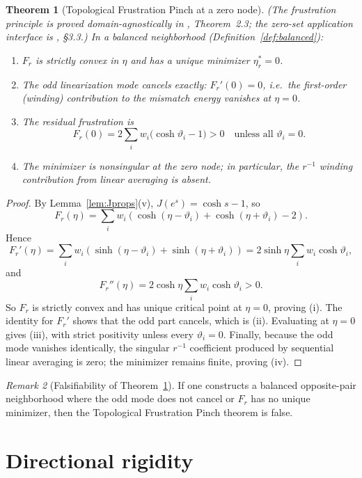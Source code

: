 \documentclass[12pt, reqno]{amsart}
\newtheorem{theorem}{Theorem}[section]
\theoremstyle{definition}
\theoremstyle{remark}
\newtheorem{remark}[theorem]{Remark}
\numberwithin{equation}{section}
\newcommand{\Jc}{J}
\begin{document}
\begin{theorem}[Topological Frustration Pinch at a zero node]%
\label{thm:TF-pinch}
\textup{(}The frustration principle is proved domain-agnostically in
\cite{F2Frustration}, Theorem~2.3; the zero-set application interface
is \cite{F2Frustration}, \S3.3.\textup{)}
In a balanced neighborhood (Definition~\ref{def:balanced}):
\begin{enumerate}[label=\textup{(\roman*)}]
\item $F_r$ is strictly convex in $\eta$ and has a unique minimizer
$\eta_r^\ast=0$.
\item The odd linearization mode cancels exactly:
$F_r'(0)=0$, i.e.\ the first-order (winding) contribution to the
mismatch energy vanishes at $\eta=0$.
\item The residual frustration is
\[
F_r(0)=2\sum_i w_i\bigl(\cosh\vartheta_i-1\bigr)>0
\quad\text{unless all }\vartheta_i=0.
\]
\item The minimizer is nonsingular at the zero node; in particular,
the $r^{-1}$ winding contribution from linear averaging is absent.
\end{enumerate}
\end{theorem}
\begin{proof}
By Lemma~\ref{lem:Jprops}(v),
$\Jc(e^s)=\cosh s-1$, so
\[
F_r(\eta)=\sum_i w_i\!\left(\cosh(\eta-\vartheta_i)+\cosh(\eta+\vartheta_i)-2\right).
\]
Hence
\[
F_r'(\eta)=\sum_i w_i\!\left(\sinh(\eta-\vartheta_i)+\sinh(\eta+\vartheta_i)\right)
=2\sinh\eta\sum_i w_i\cosh\vartheta_i,
\]
and
\[
F_r''(\eta)=2\cosh\eta\sum_i w_i\cosh\vartheta_i>0.
\]
So $F_r$ is strictly convex and has unique critical point at $\eta=0$,
proving (i).  The identity for $F_r'$ shows that the odd part cancels,
which is (ii).  Evaluating at $\eta=0$ gives (iii), with strict
positivity unless every $\vartheta_i=0$.
Finally, because the odd mode vanishes identically, the singular
$r^{-1}$ coefficient produced by sequential linear averaging is zero;
the minimizer remains finite, proving (iv).
\end{proof}

\begin{remark}[Falsifiability of Theorem~\ref{thm:TF-pinch}]
If one constructs a balanced opposite-pair neighborhood where the
odd mode does not cancel or $F_r$ has no unique minimizer, then the
Topological Frustration Pinch theorem is false.
\end{remark}

\section{Directional rigidity}\label{sec:direction}
\end{document}

